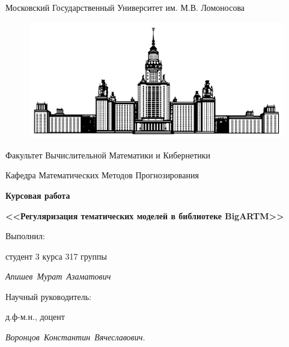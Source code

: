 \documentclass[12pt]{article}
\begin{document}
\begin{center}
\thispagestyle{empty}
Московский Государственный Университет им. М.В. Ломоносова

\begin{figure}[h!]
\begin{center}
\includegraphics[scale = 0.1]{title_image.png}
\end{center}
\end{figure}

Факультет Вычислительной Математики и Кибернетики

Кафедра Математических Методов Прогнозирования

\vspace{88pt}
\large

\LARGE
{\bf Курсовая работа}
\vspace{20pt}

{\bf <<Регуляризация тематических моделей в библиотеке BigARTM>>}

\vspace{120pt}
\begin{flushright}
\normalsize

\hfill\parbox{8cm}{
Выполнил:

\vspace{5pt}
студент 3 курса 317 группы

\vspace{5pt}
{\it Апишев~Мурат~Азаматович}

\vspace{20pt}
Научный руководитель:

\vspace{5pt}
д.ф-м.н., доцент

\vspace{5pt}
{\it Воронцов~Константин~Вячеславович.}
}

\vspace{80pt}
\end{flushright}

\newpage
\end{center}
\end{document}
